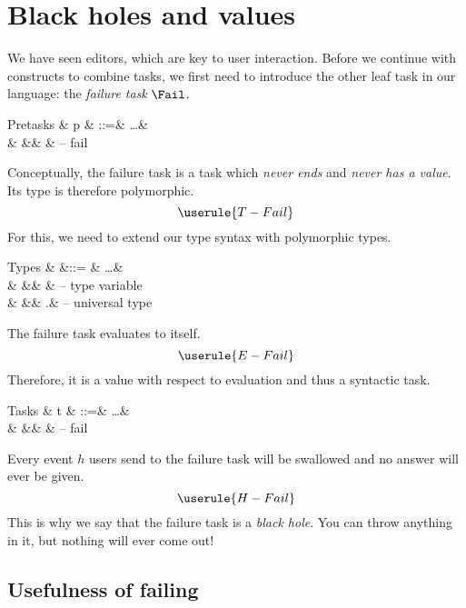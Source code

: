 
\section{Black holes and values}

We have seen editors,
which are key to user interaction.
Before we continue with constructs to combine tasks,
we first need to introduce the other leaf task in our language:
the \emph{failure task} $\Fail$.

\begin{grammar}
  Pretasks
    & p & ::=& \ldots & \\
    &   &\mid& \Fail  & – fail \\
\end{grammar}
Conceptually,
the failure task is a task which \emph{never ends} and \emph{never has a value}.
Its type is therefore polymorphic.
\begin{equation*}
  \userule{T-Fail}
\end{equation*}
For this,
we need to extend our type syntax with polymorphic types.
\begin{grammar}
  Types
    & \tau &::= & \ldots             & \\
    &      &\mid& \alpha             & – type variable \\
    &      &\mid& \forall\alpha.\tau & – universal type \\
\end{grammar}

The failure task evaluates to itself.
\begin{equation*}
  \userule{E-Fail}
\end{equation*}
Therefore,
it is a value with respect to evaluation and thus a syntactic task.
\begin{grammar}
  Tasks
    & t & ::=& \ldots & \\
    &   &\mid& \Fail  & – fail \\
\end{grammar}

Every event $h$ users send to the failure task will be swallowed
and no answer will ever be given.
\begin{equation*}
  \userule{H-Fail}
\end{equation*}
This is why we say that the failure task is a \emph{black hole}.
You can throw anything in it,
but nothing will ever come out!


\subsection{Usefulness of failing}
\label{sec:succeeding}

